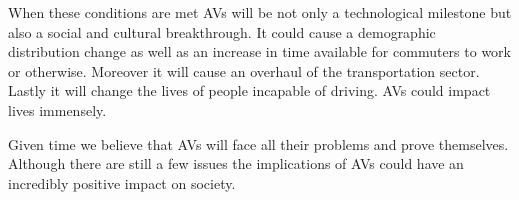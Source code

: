 \documentclass[11pt]{article}
\begin{document}
When these conditions are met AVs will be not only a technological milestone but also a social and cultural breakthrough. It could cause a demographic distribution change as well as an increase in time available for commuters to work or otherwise. Moreover it will cause an overhaul of the transportation sector. Lastly it will change the lives of people incapable of driving. AVs could impact lives immensely. 


Given time we believe that AVs will face all their problems and prove themselves. Although there are still a few issues the implications of AVs could have an incredibly positive impact on society. 



%

\end{document}
